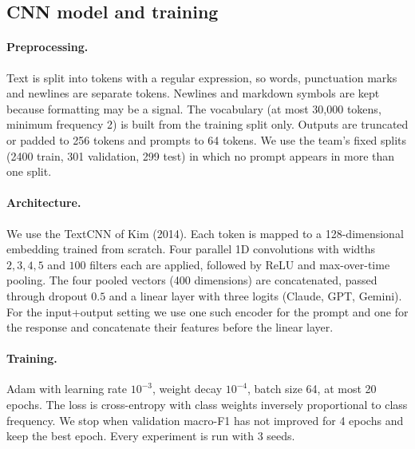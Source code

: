 \subsection{CNN model and training}
\paragraph{Preprocessing.} Text is split into tokens with a regular expression, so words, punctuation marks and newlines are separate tokens. Newlines and markdown symbols are kept because formatting may be a signal. The vocabulary (at most 30{,}000 tokens, minimum frequency 2) is built from the training split only. Outputs are truncated or padded to 256 tokens and prompts to 64 tokens. We use the team's fixed splits (2400 train, 301 validation, 299 test) in which no prompt appears in more than one split.

\paragraph{Architecture.} We use the TextCNN of Kim (2014). Each token is mapped to a 128-dimensional embedding trained from scratch. Four parallel 1D convolutions with widths $2,3,4,5$ and $100$ filters each are applied, followed by ReLU and max-over-time pooling. The four pooled vectors (400 dimensions) are concatenated, passed through dropout $0.5$ and a linear layer with three logits (Claude, GPT, Gemini). For the input+output setting we use one such encoder for the prompt and one for the response and concatenate their features before the linear layer.

\paragraph{Training.} Adam with learning rate $10^{-3}$, weight decay $10^{-4}$, batch size 64, at most 20 epochs. The loss is cross-entropy with class weights inversely proportional to class frequency. We stop when validation macro-F1 has not improved for 4 epochs and keep the best epoch. Every experiment is run with 3 seeds.

